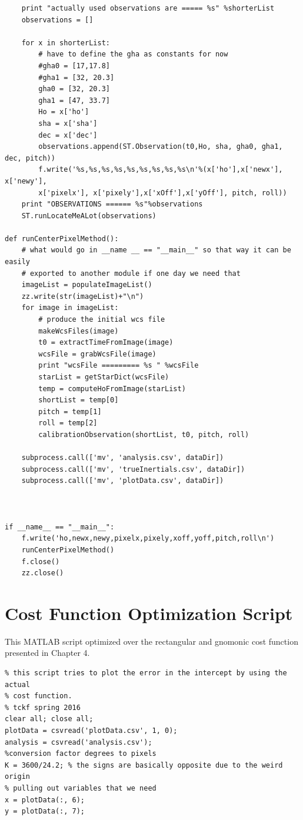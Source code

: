 \documentclass[12pt,a4paper]{book}
\begin{document}
\begin{appendices}
\begin{verbatim}
    print "actually used observations are ===== %s" %shorterList
    observations = []
    
    for x in shorterList:
        # have to define the gha as constants for now
        #gha0 = [17,17.8]
        #gha1 = [32, 20.3]
        gha0 = [32, 20.3]
        gha1 = [47, 33.7]
        Ho = x['ho']
        sha = x['sha']
        dec = x['dec']
        observations.append(ST.Observation(t0,Ho, sha, gha0, gha1, dec, pitch))
        f.write('%s,%s,%s,%s,%s,%s,%s,%s,%s\n'%(x['ho'],x['newx'], x['newy'],
        x['pixelx'], x['pixely'],x['xOff'],x['yOff'], pitch, roll))
    print "OBSERVATIONS ====== %s"%observations
    ST.runLocateMeALot(observations)

def runCenterPixelMethod():
    # what would go in __name __ == "__main__" so that way it can be easily 
    # exported to another module if one day we need that
    imageList = populateImageList()
    zz.write(str(imageList)+"\n")
    for image in imageList:
        # produce the initial wcs file
        makeWcsFiles(image)
        t0 = extractTimeFromImage(image)
        wcsFile = grabWcsFile(image)
        print "wcsFile ========= %s " %wcsFile
        starList = getStarDict(wcsFile)
        temp = computeHoFromImage(starList)
        shortList = temp[0]
        pitch = temp[1]
        roll = temp[2]
        calibrationObservation(shortList, t0, pitch, roll)

    subprocess.call(['mv', 'analysis.csv', dataDir])
    subprocess.call(['mv', 'trueInertials.csv', dataDir])
    subprocess.call(['mv', 'plotData.csv', dataDir])
        


if __name__ == "__main__":
    f.write('ho,newx,newy,pixelx,pixely,xoff,yoff,pitch,roll\n')
    runCenterPixelMethod()  
    f.close()
    zz.close()
\end{verbatim}
\chapter{Cost Function Optimization Script}
This MATLAB script optimized over the rectangular and gnomonic cost function presented in Chapter 4.  
\begin{verbatim}
% this script tries to plot the error in the intercept by using the actual
% cost function. 
% tckf spring 2016
clear all; close all;
plotData = csvread('plotData.csv', 1, 0);
analysis = csvread('analysis.csv');
%conversion factor degrees to pixels
K = 3600/24.2; % the signs are basically opposite due to the weird origin
% pulling out variables that we need
x = plotData(:, 6);
y = plotData(:, 7);


\end{verbatim}
\end{appendices}
\end{document}
